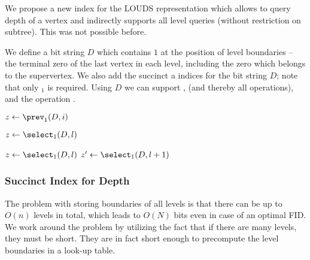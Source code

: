 We propose a new index for the LOUDS representation which allows to query depth of a vertex and indirectly supports all level queries (without restriction on subtree).
This was not possible before.

We define a bit string $D$ which contains $1$ at the position of level boundaries -- the terminal zero of the last vertex in each level, including the zero which belongs to the supervertex.
We also add the succinct \rank{} a \select{} indices for the bit string $D$; note that only \select$_1$ is required.
Using $D$ we can support \levelRank{}, \levelSelect{} (and thereby all \levelAny{} operations), and the operation \dep{}.

\begin{algorithmic}
	\State $z \gets \prev_1(D, i)$ 
	\State {}
\EndFunction
\end{algorithmic}

\begin{algorithmic}
	\State $z \gets \select_1(D, l)$ 
	\State {}
\EndFunction
\end{algorithmic}

\begin{algorithmic}
	\State $z \gets \select_1(D, l)$ 
	\State $z' \gets \select_1(D, l + 1)$ 
	\State {}
\EndFunction
\end{algorithmic}

\begin{algorithmic}
	\State {}
\EndFunction
\end{algorithmic}

\subsubsection{Succinct Index for Depth}\label{ss:louds-depth}

The problem with storing boundaries of all levels is that there can be up to $O(n)$ levels in total, which leads to $O(N)$ bits even in case of an optimal FID.
We work around the problem by utilizing the fact that if there are many levels, they must be short.
They are in fact short enough to precompute the level boundaries in a look-up table.

